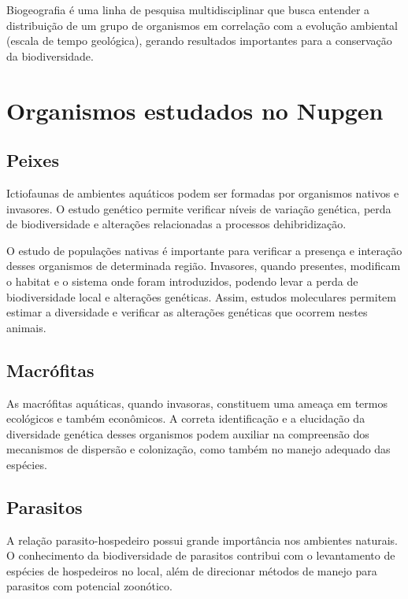 \documentclass[
  letterpaper,
  DIV=11,
  numbers=noendperiod]{scrreprt}
\begin{document}
Biogeografia é uma linha de pesquisa multidisciplinar que busca entender
a distribuição de um grupo de organismos em correlação com a evolução
ambiental (escala de tempo geológica), gerando resultados importantes
para a conservação da biodiversidade.

\hypertarget{organismos-estudados-no-nupgen}{%
\section{Organismos estudados no
Nupgen}\label{organismos-estudados-no-nupgen}}

\hypertarget{peixes}{%
\subsection{Peixes}\label{peixes}}

Ictiofaunas de ambientes aquáticos podem ser formadas por organismos
nativos e invasores. O estudo genético permite verificar níveis de
variação genética, perda de biodiversidade e alterações relacionadas a
processos dehibridização.

O estudo de populações nativas é importante para verificar a presença e
interação desses organismos de determinada região. Invasores, quando
presentes, modificam o habitat e o sistema onde foram introduzidos,
podendo levar a perda de biodiversidade local e alterações genéticas.
Assim, estudos moleculares permitem estimar a diversidade e verificar as
alterações genéticas que ocorrem nestes animais.

\hypertarget{macruxf3fitas}{%
\subsection{Macrófitas}\label{macruxf3fitas}}

As macrófitas aquáticas, quando invasoras, constituem uma ameaça em
termos ecológicos e também econômicos. A correta identificação e a
elucidação da diversidade genética desses organismos podem auxiliar na
compreensão dos mecanismos de dispersão e colonização, como também no
manejo adequado das espécies.

\hypertarget{parasitos}{%
\subsection{Parasitos}\label{parasitos}}

A relação parasito-hospedeiro possui grande importância nos ambientes
naturais. O conhecimento da biodiversidade de parasitos contribui com o
levantamento de espécies de hospedeiros no local, além de direcionar
métodos de manejo para parasitos com potencial zoonótico.
\end{document}
